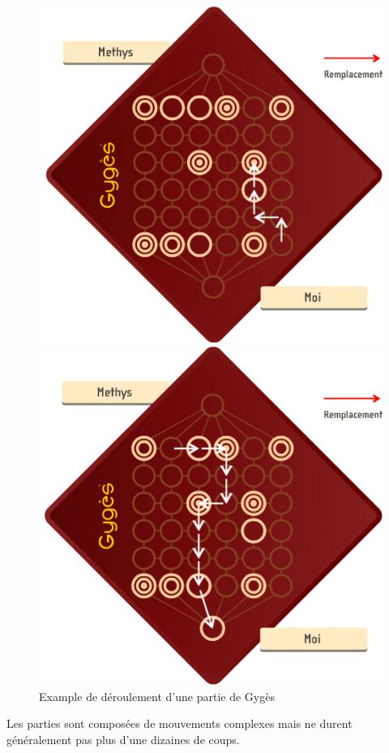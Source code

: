 \begin{figure}[h!]
\begin{minipage}[b]{0.4\linewidth}
		\end{minipage}

		\begin{minipage}[b]{0.4\linewidth}
		\centering
		\includegraphics[width=\textwidth]{images/ex3.png}
		\end{minipage}
		\hspace{0.5cm}
		\begin{minipage}[b]{0.4\linewidth}
		\centering
		\includegraphics[width=\textwidth]{images/ex4.png}
		\end{minipage}
		\caption{Example de déroulement d'une partie de Gygès}
	\end{figure}

	\vspace{1em}
	Les parties sont composées de mouvements complexes mais ne durent généralement
	pas plus d'une dizaines de coups.
